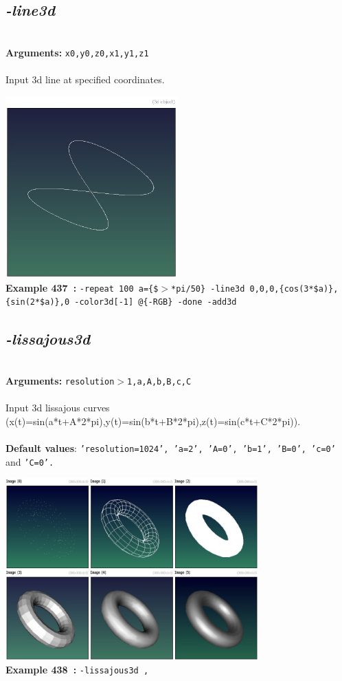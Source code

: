 \documentclass[a4paper,11pt,twoside]{book}
\begin{document}
\subsection{\emph{-line3d} }\vspace*{-0.5em}
~\\\textbf{Arguments: } 
{\small \texttt{x0,y0,z0,x1,y1,z1}}\\~\\
Input 3d line at specified coordinates.
\begin{center}\includegraphics[keepaspectratio=true,height=7cm,width=\textwidth]{img/gmic_def437.jpg}\\
{\footnotesize \textbf{Example 437~:} \texttt{-repeat 100 a=\{\$$>$*pi/50\} -line3d 0,0,0,\{cos(3*\$a)\},\{sin(2*\$a)\},0 -color3d[-1] @\{-RGB\} -done -add3d}}
\end{center}

\subsection{\emph{-lissajous3d} }\vspace*{-0.5em}
~\\\textbf{Arguments: } 
{\small \texttt{resolution$>$1,a,A,b,B,c,C}}\\~\\
Input 3d lissajous curves (x(t)=sin(a*t+A*2*pi),y(t)=sin(b*t+B*2*pi),z(t)=sin(c*t+C*2*pi)).
~\\~\\\textbf{Default values}: {\small \texttt{'resolution=1024', 'a=2', 'A=0', 'b=1', 'B=0', 'c=0'} and \texttt{'C=0'.}}
\begin{center}\includegraphics[keepaspectratio=true,height=7cm,width=\textwidth]{img/gmic_def438.jpg}\\
{\footnotesize \textbf{Example 438~:} \texttt{-lissajous3d ,}}
\end{center}
\end{document}
